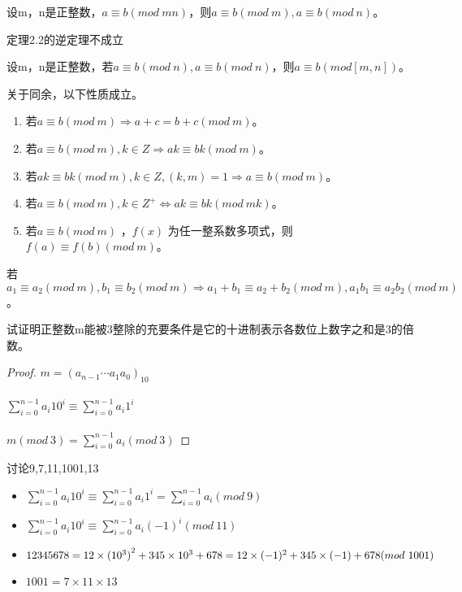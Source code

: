 \documentclass[cn,10pt]{elegantbook}
\begin{document}
\begin{theorem}[同余的性质]
  设m，n是正整数，$a \equiv b(mod \ mn)$，则$a \equiv b(mod \ m),a \equiv b(mod \ n)$。
\end{theorem}
\begin{note}
  定理2.2的逆定理不成立
\end{note}
\begin{theorem}
  设m，n是正整数，若$a \equiv b(mod \ n),a \equiv b(mod \ n)$，则$a \equiv b(mod[m,n])$。
\end{theorem}
\begin{theorem}
  关于同余，以下性质成立。
  \begin{enumerate}[(1)]
    \item 若$a \equiv b(mod \ m) \Rightarrow a+c =b+c(mod \ m) $。
    \item 若$a \equiv b(mod \ m),k \in Z \Rightarrow ak \equiv bk(mod \ m)$。
    \item 若$ak \equiv bk(mod \ m),k \in Z,(k,m) =1  \Rightarrow a \equiv b(mod \ m)$。
    \item 若$a \equiv b(mod \ m),k \in Z^{+} \Leftrightarrow ak \equiv bk(mod \ mk)$。
    \item 若$a \equiv b(mod \ m)$ ，$f(x)$ 为任一整系数多项式，则$f(a) \equiv f(b)(mod \ m)$。
  \end{enumerate}
\end{theorem}
\begin{conclusion}
  若$a_1 \equiv a_2 (mod \ m),b_1 \equiv b_2 (mod \ m) \Rightarrow a_1+b_1 \equiv a_2+b_2(mod \ m), a_1b_1 \equiv a_2b_2(mod \ m)$。
\end{conclusion}
\begin{example}
  试证明正整数m能被3整除的充要条件是它的十进制表示各数位上数字之和是3的倍数。
\end{example}
\begin{proof}
  $m = (a_{n-1} \cdots a_1a_0)_{10}$\\ \\
  $\sum_{i=0}^{n-1} a_i10^i \equiv \sum_{i=0}^{n-1}a_i1^i$\\ \\
  $m(mod \ 3) = \sum_{i=0}^{n-1}a_i(mod \ 3)$
\end{proof}
\begin{note}
  讨论9,7,11,1001,13 \\ 
  \begin{itemize}
    \item $\sum_{i=0}^{n-1} a_i10^i \equiv \sum_{i=0}^{n-1}a_i1^i = \sum_{i=0}^{n-1}a_i(mod \ 9)$\\
    \item $\sum_{i=0}^{n-1} a_i10^i \equiv \sum_{i=0}^{n-1}a_i(-1)^i (mod \ 11)$\\
    \item $12345678 = 12 \times {(10^3)}^2+345 \times 10^3 +678\\=12 \times (-1)^2+345 \times (-1)+678(mod \ 1001)$\\
    \item $1001 = 7 \times 11 \times 13$
  \end{itemize}
\end{note}
\end{document}
